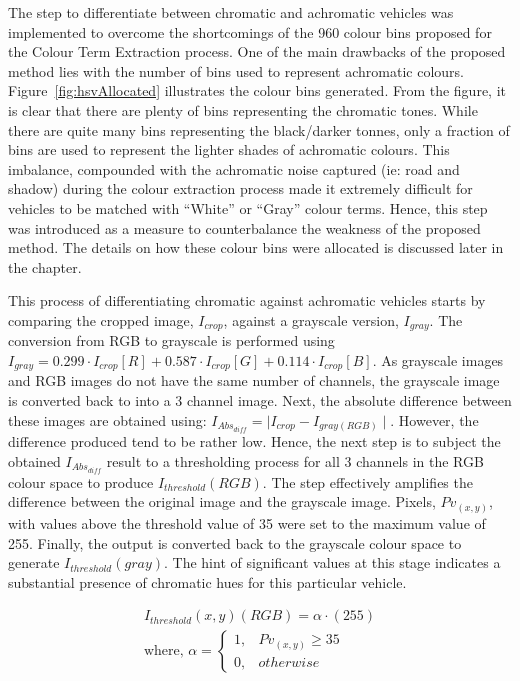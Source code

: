The step to differentiate between chromatic and achromatic vehicles was implemented to overcome the shortcomings of the 960 colour bins proposed for the Colour Term Extraction process.
One of the main drawbacks of the proposed method lies with the number of bins used to represent achromatic colours.
Figure~\ref{fig:hsvAllocated} illustrates the colour bins generated. From the figure, it is clear that there are plenty of bins representing the chromatic tones.
While there are quite many bins representing the black/darker tonnes, only a fraction of bins are used to represent the lighter shades of achromatic colours.
This imbalance, compounded with the achromatic noise captured (ie: road and shadow) during the colour extraction process made it extremely difficult for vehicles to be matched with ``White'' or ``Gray'' colour terms. Hence, this step was introduced as a measure to counterbalance the weakness of the proposed method.
The details on how these colour bins were allocated is discussed later in the chapter.

This process of differentiating chromatic against achromatic vehicles starts by comparing the cropped image, $I_{crop}$, against a grayscale version, $I_{gray}$.
The conversion from RGB to grayscale is performed using $I_{gray} = 0.299 \cdot I_{crop}[R]+0.587 \cdot I_{crop}[G]+0.114 \cdot I_{crop}[B]$.
As grayscale images and RGB images do not have the same number of channels, the grayscale image is converted back to into a 3 channel image.
Next, the absolute difference between these images are obtained using: $I_{Abs_{diff}} = \mid I_{crop} - I_{gray(RGB)} \mid$.
However, the difference produced tend to be rather low.
Hence, the next step is to subject the obtained $I_{Abs_{diff}}$ result to a thresholding process for all 3 channels in the RGB colour space to produce $I_{threshold}(RGB)$.
The step effectively amplifies the difference between the original image and the grayscale image. Pixels, $Pv_{(x,y)}$, with values above the threshold value of 35 were set to the maximum value of 255.
Finally, the output %
is converted back to the grayscale colour space to generate $I_{threshold}(gray)$. The hint of significant values at this stage indicates a substantial presence of chromatic hues for this particular vehicle.

\begin{align*}
\label{eq:threshabsolutediff}
I_{threshold}(x,y)(RGB) = \alpha \cdot (255) \\
\text{where, }
\alpha =
\begin{cases}
1, & Pv_{(x,y)} \geq 35\\
0, & otherwise
\end{cases}
\end{align*}



